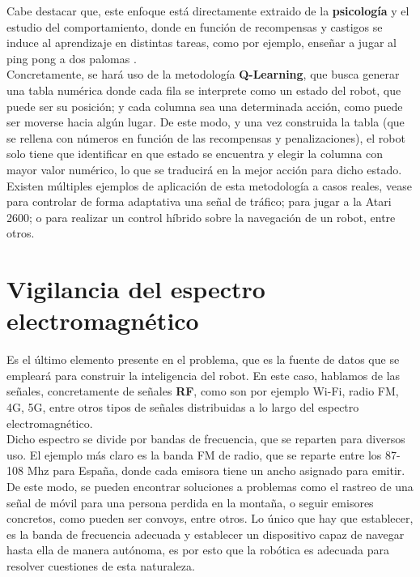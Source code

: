 Cabe destacar que, este enfoque está directamente extraido de la \textbf{psicología} y el estudio del comportamiento, donde en función de recompensas y castigos se induce al aprendizaje en distintas tareas, como por ejemplo, enseñar a jugar al ping pong a dos palomas \cite{psicologia-aprendizaje} \cite{skinner}.\\

Concretamente, se hará uso de la metodología \textbf{Q-Learning}, que busca generar una tabla numérica donde cada fila se interprete como un estado del robot, que puede ser su posición; y cada columna sea una determinada acción, como puede ser moverse hacia algún lugar. De este modo, y una vez construida la tabla (que se rellena con números en función de las recompensas y penalizaciones), el robot solo tiene que identificar en que estado se encuentra y elegir la columna con mayor valor numérico, lo que se traducirá en la mejor acción para dicho estado. \cite{q-learning}\\

Existen múltiples ejemplos de aplicación de esta metodología a casos reales, vease para controlar de forma adaptativa una señal de tráfico; para jugar a la Atari 2600; o para realizar un control híbrido sobre la navegación de un robot, entre otros. \cite{q-learning-app}\\

\section{Vigilancia del espectro electromagnético}
\label{subsec:señales}

Es el último elemento presente en el problema, que es la fuente de datos que se empleará para construir la inteligencia del robot. En este caso, hablamos de las señales, concretamente de señales \textbf{\ac{RF}}, como son por ejemplo Wi-Fi, radio FM, 4G, 5G, entre otros tipos de señales distribuidas a lo largo del espectro electromagnético.\\

Dicho espectro se divide por bandas de frecuencia, que se reparten para diversos uso. El ejemplo más claro es la banda FM de radio, que se reparte entre los 87-108 Mhz para España, donde cada emisora tiene un ancho asignado para emitir. \cite{bandw}\\

De este modo, se pueden encontrar soluciones a problemas como el rastreo de una señal de móvil para una persona perdida en la montaña, o seguir emisores concretos, como pueden ser convoys, entre otros. Lo único que hay que establecer, es la banda de frecuencia adecuada y establecer un dispositivo capaz de navegar hasta ella de manera autónoma, es por esto que la robótica es adecuada para resolver cuestiones de esta naturaleza.\\

